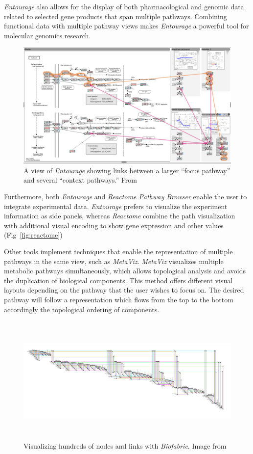 \documentclass[review,journal]{vgtc}         %
\begin{document}
\emph{Entourage} also allows for the display of both pharmacological and genomic data related to selected gene products that span multiple pathways. Combining functional data with multiple pathway views makes \emph{Entourage} a powerful tool for molecular genomics research.

\begin{figure}[htb]
  \centering
  \includegraphics[width=\linewidth]{figures/entourage}
  \caption{\label{fig:entourage} A view of \emph{Entourage} showing links between a larger ``focus pathway'' and several ``context pathways.'' From~\cite{Lex2013entourage}}
\end{figure}

Furthermore, both \textit{Entourage} and \textit{Reactome Pathway Browser} enable the user to integrate experimental data. \textit{Entourage} prefers to visualize the experiment information as side panels, whereas \textit{Reactome} combine the path visualization with additional visual encoding to show gene expression and other values (Fig~\ref{fig:reactome})

Other tools implement techniques that enable the representation of multiple pathways in the same view, such as \textit{MetaViz}. \textit{MetaViz} visualizes multiple metabolic pathways simultaneously, which allows topological analysis and avoids the duplication of biological components. This method offers different visual layouts depending on the pathway that the user wishes to focus on. The desired pathway will follow a representation which flows from the top to the bottom accordingly the topological ordering of components.

\begin{figure}[t]
  \centering
  \includegraphics[height=2.5in]{figures/biofabric}
  \caption{Visualizing hundreds of nodes and links with \emph{Biofabric}. Image from~\cite{Longabaugh2012biofabric}}
  \label{fig:biofabric}
\end{figure}
\end{document}
